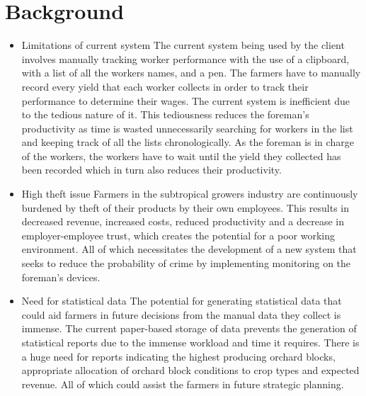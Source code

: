 \documentclass[11pt,fleqn]{book} %
\begin{document}
	\chapter{Background}
	\begin{itemize}
		\item Limitations of current system\newline\newline
		The current system being used by the client involves manually tracking worker performance with the use of a clipboard, with a list of all the workers names, and a pen.  The farmers have to manually record every yield that each worker collects in order to track their performance to determine their wages. The current system is inefficient due to the tedious nature of it. This tediousness reduces the foreman’s productivity as time is wasted unnecessarily searching for workers in the list and keeping track of all the lists chronologically. As the foreman is in charge of the workers, the workers have to wait until the yield they collected has been recorded which in turn also reduces their productivity.\newline
		
		\item High theft issue\newline\newline
		Farmers in the subtropical growers industry are continuously burdened by theft of their products by their own employees. This results in decreased revenue, increased costs, reduced productivity and a decrease in employer-employee trust, which creates the potential for a poor working environment. All of which necessitates the development of a new system that seeks to reduce the probability of crime by implementing monitoring on the foreman’s devices.\newline
		
		\item Need for statistical data\newline\newline
		The potential for generating statistical data that could aid farmers in future decisions from the manual data they collect is immense. The current paper-based storage of data prevents the generation of statistical reports due to the immense workload and time it requires. There is a huge need for reports indicating the highest producing orchard blocks, appropriate allocation of orchard block conditions to crop types and expected revenue. All of which could assist the farmers in future strategic planning.
	\end{itemize}
	
\end{document}

